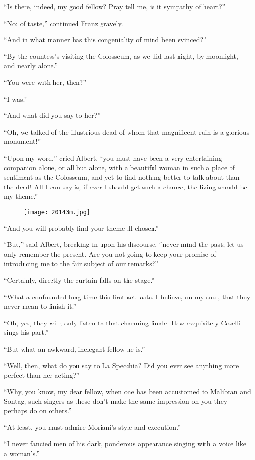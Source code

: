 “Is there, indeed, my good fellow? Pray tell me, is it sympathy of
heart?”

“No; of taste,” continued Franz gravely.

“And in what manner has this congeniality of mind been evinced?”

“By the countess’s visiting the Colosseum, as we did last night, by
moonlight, and nearly alone.”

“You were with her, then?”

“I was.”

“And what did you say to her?”

“Oh, we talked of the illustrious dead of whom that magnificent ruin is
a glorious monument!”

“Upon my word,” cried Albert, “you must have been a very entertaining
companion alone, or all but alone, with a beautiful woman in such a
place of sentiment as the Colosseum, and yet to find nothing better to
talk about than the dead! All I can say is, if ever I should get such a
chance, the living should be my theme.”

\begin{figure}[h]
\texttt{[image: 20143m.jpg]}
\end{figure}

“And you will probably find your theme ill-chosen.”

“But,” said Albert, breaking in upon his discourse, “never mind the
past; let us only remember the present. Are you not going to keep your
promise of introducing me to the fair subject of our remarks?”

“Certainly, directly the curtain falls on the stage.”

“What a confounded long time this first act lasts. I believe, on my
soul, that they never mean to finish it.”

“Oh, yes, they will; only listen to that charming finale. How
exquisitely Coselli sings his part.”

“But what an awkward, inelegant fellow he is.”

“Well, then, what do you say to La Specchia? Did you ever see anything
more perfect than her acting?”

“Why, you know, my dear fellow, when one has been accustomed to
Malibran and Sontag, such singers as these don’t make the same
impression on you they perhaps do on others.”

“At least, you must admire Moriani’s style and execution.”

“I never fancied men of his dark, ponderous appearance singing with a
voice like a woman’s.”

